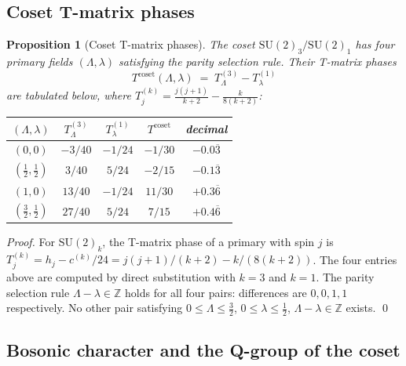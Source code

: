 \documentclass[11pt,a4paper]{article}
\newtheorem{proposition}[theorem]{Proposition}
\theoremstyle{definition}\newtheorem{definition}[theorem]{Definition}
\theoremstyle{remark}
\newcommand{\SU}{\mathrm{SU}}
\begin{document}
\subsection{Coset T-matrix phases}
\label{P17:sec:coset_T}

\begin{proposition}[Coset T-matrix phases]
\label{P17:prop:coset_T}
The coset $\SU(2)_3/\SU(2)_1$ has four primary fields $(\Lambda,\lambda)$
satisfying the parity selection rule.  Their T-matrix phases
\begin{equation}
  T^{\mathrm{coset}}(\Lambda,\lambda)
  \;=\; T^{(3)}_\Lambda - T^{(1)}_\lambda
  \label{P17:eq:Tcoset_def}
\end{equation}
are tabulated below, where
$T^{(k)}_j = \frac{j(j+1)}{k+2} - \frac{k}{8(k+2)}$:
\begin{center}
\renewcommand{\arraystretch}{1.35}
\begin{tabular}{ccccc}
\toprule
$(\Lambda,\lambda)$ & $T^{(3)}_\Lambda$ & $T^{(1)}_\lambda$
  & $T^{\mathrm{coset}}$ & decimal \\
\midrule
$(0,0)$             & $-3/40$  & $-1/24$ & $-1/30$  & $-0.0\overline{3}$ \\
$(\tfrac{1}{2},\tfrac{1}{2})$ & $3/40$ & $5/24$ & $-2/15$ & $-0.1\overline{3}$ \\
$(1,0)$             & $13/40$  & $-1/24$ & $11/30$  & $+0.3\overline{6}$ \\
$(\tfrac{3}{2},\tfrac{1}{2})$ & $27/40$ & $5/24$ & $7/15$  & $+0.4\overline{6}$ \\
\bottomrule
\end{tabular}
\end{center}
\end{proposition}

\begin{proof}
For $\SU(2)_k$, the T-matrix phase of a primary with spin $j$ is
$T_j^{(k)} = h_j - c^{(k)}/24 = j(j+1)/(k+2) - k/(8(k+2))$.
The four entries above are computed by direct substitution with
$k=3$ and $k=1$.  The parity selection rule $\Lambda-\lambda\in\mathbb{Z}$
holds for all four pairs: differences are $0,0,1,1$ respectively.
No other pair satisfying $0\leq\Lambda\leq\frac{3}{2}$,
$0\leq\lambda\leq\frac{1}{2}$, $\Lambda-\lambda\in\mathbb{Z}$ exists.
\qed
\end{proof}

\subsection{Bosonic character and the Q-group of the coset}
\label{P17:sec:coset_Qgroup}
\end{document}

